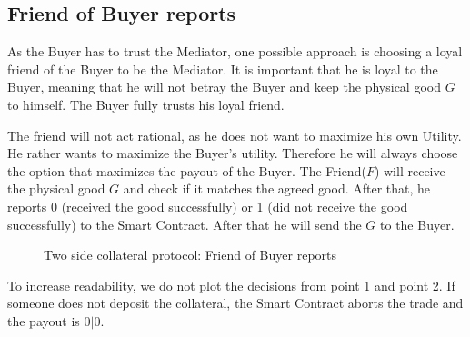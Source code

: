 \documentclass{cacthesis}
\begin{document}
\subsection{Friend of Buyer reports}
As the Buyer has to trust the Mediator, one possible approach is choosing a loyal friend of the Buyer to be the Mediator. It is important that he is loyal to the Buyer, meaning that he will not betray the Buyer and keep the physical good $G$ to himself. The Buyer fully trusts his loyal friend.\newline

The friend will not act rational, as he does not want to maximize his own Utility. He rather wants to maximize the Buyer's utility. Therefore he will always choose the option that maximizes the payout of the Buyer.
The Friend($F$) will receive the physical good $G$ and check if it matches the agreed good. After that, he reports 0 (received the good successfully) or 1 (did not receive the good successfully) to the Smart Contract. After that he will send the $G$ to the Buyer.\newline

\begin{figure}[htb!]
    \centering
    \caption{Two side collateral protocol: Friend of Buyer reports}
    \label{pro:two-side-collateral-friend}
\end{figure}

To increase readability, we do not plot the decisions from point 1 and point 2.
If someone does not deposit the collateral, the Smart Contract aborts the trade
and the payout is $0|0$.\newline
\end{document}
